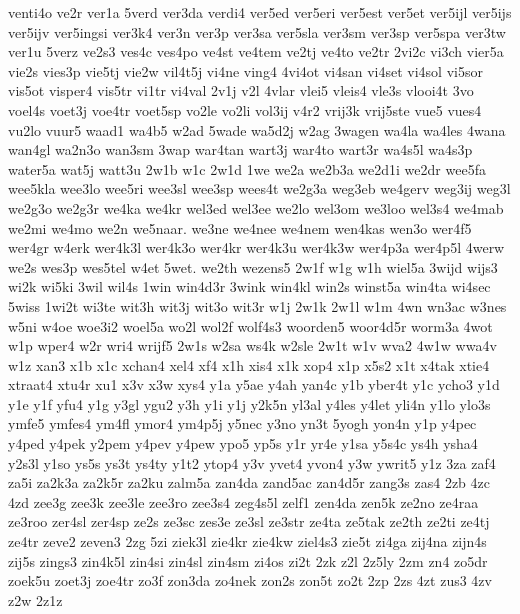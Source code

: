 {venti4o
ve2r
ver1a
5verd
ver3da
verdi4
ver5ed
ver5eri
ver5est
ver5et
ver5ijl
ver5ijs
ver5ijv
ver5ingsi
ver3k4
ver3n
ver3p
ver3sa
ver5sla
ver3sm
ver3sp
ver5spa
ver3tw
ver1u
5verz
ve2s3
ves4c
ves4po
ve4st
ve4tem
ve2tj
ve4to
ve2tr
2vi2c
vi3ch
vier5a
vie2s
vies3p
vie5tj
vie2w
vil4t5j
vi4ne
ving4
4vi4ot
vi4san
vi4set
vi4sol
vi5sor
vis5ot
visper4
vis5tr
vi1tr
vi4val
2v1j
v2l
4vlar
vlei5
vleis4
vle3s
vlooi4t
3vo
voel4s
voet3j
voe4tr
voet5sp
vo2le
vo2li
vol3ij
v4r2
vrij3k
vrij5ste
vue5
vues4
vu2lo
vuur5
waad1
wa4b5
w2ad
5wade
wa5d2j
w2ag
3wagen
wa4la
wa4les
4wana
wan4gl
wa2n3o
wan3sm
3wap
war4tan
wart3j
war4to
wart3r
wa4s5l
wa4s3p
water5a
wat5j
watt3u
2w1b
w1c
2w1d
1we
we2a
we2b3a
we2d1i
we2dr
wee5fa
wee5kla
wee3lo
wee5ri
wee3sl
wee3sp
wees4t
we2g3a
weg3eb
we4gerv
weg3ij
weg3l
we2g3o
we2g3r
we4ka
we4kr
wel3ed
wel3ee
we2lo
wel3om
we3loo
wel3s4
we4mab
we2mi
we4mo
we2n
we5naar.
we3ne
we4nee
we4nem
wen4kas
wen3o
wer4f5
wer4gr
w4erk
wer4k3l
wer4k3o
wer4kr
wer4k3u
wer4k3w
wer4p3a
wer4p5l
4werw
we2s
wes3p
wes5tel
w4et
5wet.
we2th
wezens5
2w1f
w1g
w1h
wiel5a
3wijd
wijs3
wi2k
wi5ki
3wil
wil4s
1win
win4d3r
3wink
win4kl
win2s
winst5a
win4ta
wi4sec
5wiss
1wi2t
wi3te
wit3h
wit3j
wit3o
wit3r
w1j
2w1k
2w1l
w1m
4wn
wn3ac
w3nes
w5ni
w4oe
woe3i2
woel5a
wo2l
wol2f
wolf4s3
woorden5
woor4d5r
worm3a
4wot
w1p
wper4
w2r
wri4
wrijf5
2w1s
w2sa
ws4k
w2sle
2w1t
w1v
wva2
4w1w
wwa4v
w1z
xan3
x1b
x1c
xchan4
xel4
xf4
x1h
xis4
x1k
xop4
x1p
x5s2
x1t
x4tak
xtie4
xtraat4
xtu4r
xu1
x3v
x3w
xys4
y1a
y5ae
y4ah
yan4c
y1b
yber4t
y1c
ycho3
y1d
y1e
y1f
yfu4
y1g
y3gl
ygu2
y3h
y1i
y1j
y2k5n
yl3al
y4les
y4let
yli4n
y1lo
ylo3s
ymfe5
ymfes4
ym4fl
ymor4
ym4p5j
y5nec
y3no
yn3t
5yogh
yon4n
y1p
y4pec
y4ped
y4pek
y2pem
y4pev
y4pew
ypo5
yp5s
y1r
yr4e
y1sa
y5s4c
ys4h
ysha4
y2s3l
y1so
ys5s
ys3t
ys4ty
y1t2
ytop4
y3v
yvet4
yvon4
y3w
ywrit5
y1z
3za
zaf4
za5i
za2k3a
za2k5r
za2ku
zalm5a
zan4da
zand5ac
zan4d5r
zang3s
zas4
2zb
4zc
4zd
zee3g
zee3k
zee3le
zee3ro
zee3s4
zeg4s5l
zelf1
zen4da
zen5k
ze2no
ze4raa
ze3roo
zer4sl
zer4sp
ze2s
ze3sc
zes3e
ze3sl
ze3str
ze4ta
ze5tak
ze2th
ze2ti
ze4tj
ze4tr
zeve2
zeven3
2zg
5zi
ziek3l
zie4kr
zie4kw
ziel4s3
zie5t
zi4ga
zij4na
zijn4s
zij5s
zings3
zin4k5l
zin4si
zin4sl
zin4sm
zi4os
zi2t
2zk
z2l
2z5ly
2zm
zn4
zo5dr
zoek5u
zoet3j
zoe4tr
zo3f
zon3da
zo4nek
zon2s
zon5t
zo2t
2zp
2zs
4zt
zus3
4zv
z2w
2z1z
}
\endinput
